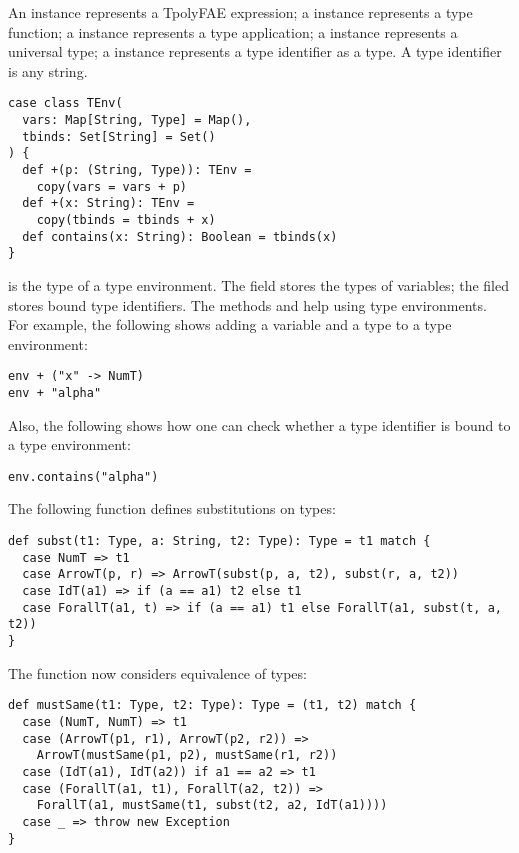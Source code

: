 An  instance represents a TpolyFAE expression; a  instance
represents a type function; a  instance represents a type application;
a
 instance represents a universal type; a  instance
represents a
type identifier as a type. A type identifier is any string.

\begin{verbatim}
case class TEnv(
  vars: Map[String, Type] = Map(),
  tbinds: Set[String] = Set()
) {
  def +(p: (String, Type)): TEnv =
    copy(vars = vars + p)
  def +(x: String): TEnv =
    copy(tbinds = tbinds + x)
  def contains(x: String): Boolean = tbinds(x)
}
\end{verbatim}

 is the type of a type environment. The field  stores the
types of
variables; the filed  stores bound type identifiers. The methods
\code{+} and
 help using type environments. For example, the following shows
adding
a variable and a type to a type environment:

\begin{verbatim}
env + ("x" -> NumT)
env + "alpha"
\end{verbatim}

Also, the following shows how one can check whether a type identifier is bound
to a type environment:

\begin{verbatim}
env.contains("alpha")
\end{verbatim}

The following function  defines substitutions on types:

\begin{verbatim}
def subst(t1: Type, a: String, t2: Type): Type = t1 match {
  case NumT => t1
  case ArrowT(p, r) => ArrowT(subst(p, a, t2), subst(r, a, t2))
  case IdT(a1) => if (a == a1) t2 else t1
  case ForallT(a1, t) => if (a == a1) t1 else ForallT(a1, subst(t, a, t2))
}
\end{verbatim}

The function  now considers equivalence of types:

\begin{verbatim}
def mustSame(t1: Type, t2: Type): Type = (t1, t2) match {
  case (NumT, NumT) => t1
  case (ArrowT(p1, r1), ArrowT(p2, r2)) =>
    ArrowT(mustSame(p1, p2), mustSame(r1, r2))
  case (IdT(a1), IdT(a2)) if a1 == a2 => t1
  case (ForallT(a1, t1), ForallT(a2, t2)) =>
    ForallT(a1, mustSame(t1, subst(t2, a2, IdT(a1))))
  case _ => throw new Exception
}
\end{verbatim}

